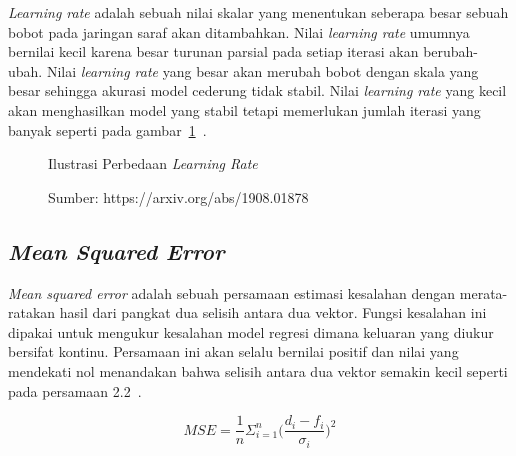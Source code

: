 \textit{Learning rate} adalah sebuah nilai skalar yang menentukan seberapa besar sebuah bobot pada
jaringan saraf akan ditambahkan. Nilai \textit{learning rate} umumnya bernilai kecil karena
besar turunan parsial pada setiap iterasi akan berubah-ubah. Nilai \textit{learning rate} yang besar
akan merubah bobot dengan skala yang besar sehingga akurasi model cederung tidak stabil. Nilai
\textit{learning rate} yang kecil akan menghasilkan model yang stabil tetapi memerlukan jumlah iterasi
yang banyak seperti pada gambar~\ref{fig:lr}~\cite{2019arXiv190801878Y}.

\begin{figure}[htbp]
    \begin{center}
    \end{center}
    \vspace{-20pt}
    \captionsetup{labelfont=bf, textfont=bf}
    \caption{Ilustrasi Perbedaan \textit{Learning Rate}}
    \vspace{-10pt}
    \captionsetup{labelfont=md, textfont=md}
    \caption*{Sumber: https://arxiv.org/abs/1908.01878}
    \label{fig:lr}
\end{figure}

\subsection{\textit{Mean Squared Error}}
\textit{Mean squared error} adalah sebuah persamaan estimasi kesalahan dengan merata-ratakan
hasil dari pangkat dua selisih antara dua vektor. Fungsi kesalahan ini dipakai untuk mengukur
kesalahan model regresi dimana keluaran yang diukur bersifat kontinu. Persamaan ini akan selalu
bernilai positif dan nilai yang mendekati nol menandakan bahwa selisih antara dua vektor semakin kecil
seperti pada persamaan 2.2~\cite{TORABI201376}.

\begin{equation}
    MSE = \frac{1}{n}\Sigma_{i=1}^{n}{\Big(\frac{d_i -f_i}{\sigma_i}\Big)^2}
\end{equation}

